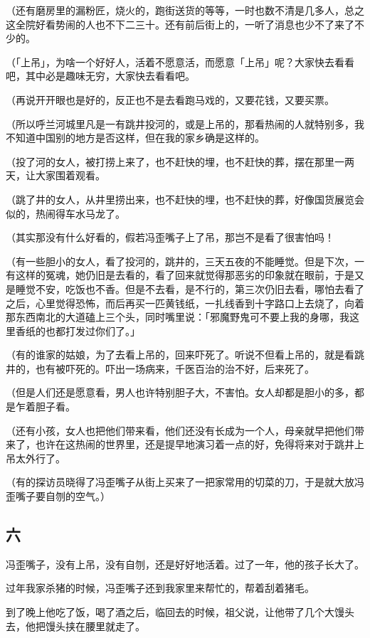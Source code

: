 \documentclass[UTF8]{ctexart}
\begin{document}
（还有磨房里的漏粉匠，烧火的，跑街送货的等等，一时也数不清是几多人，总之这全院好看势闹的人也不下二三十。还有前后街上的，一听了消息也少不了来了不少的。

（「上吊」，为啥一个好好人，活着不愿意活，而愿意「上吊」呢？大家快去看看吧，其中必是趣味无穷，大家快去看看吧。

（再说开开眼也是好的，反正也不是去看跑马戏的，又要花钱，又要买票。

（所以呼兰河城里凡是一有跳井投河的，或是上吊的，那看热闹的人就特别多，我不知道中国别的地方是否这样，但在我的家乡确是这样的。

（投了河的女人，被打捞上来了，也不赶快的埋，也不赶快的葬，摆在那里一两天，让大家围着观看。

（跳了井的女人，从井里捞出来，也不赶快的埋，也不赶快的葬，好像国货展览会似的，热闹得车水马龙了。

（其实那没有什么好看的，假若冯歪嘴子上了吊，那岂不是看了很害怕吗！

（有一些胆小的女人，看了投河的，跳井的，三天五夜的不能睡觉。但是下次，一有这样的冤魂，她仍旧是去看的，看了回来就觉得那恶劣的印象就在眼前，于是又是睡觉不安，吃饭也不香。但是不去看，是不行的，第三次仍旧去看，哪怕去看了之后，心里觉得恐怖，而后再买一匹黄钱纸，一扎线香到十字路口上去烧了，向着那东西南北的大道磕上三个头，同时嘴里说：「邪魔野鬼可不要上我的身哪，我这里香纸的也都打发过你们了。」

（有的谁家的姑娘，为了去看上吊的，回来吓死了。听说不但看上吊的，就是看跳井的，也有被吓死的。吓出一场病来，千医百治的治不好，后来死了。

（但是人们还是愿意看，男人也许特别胆子大，不害怕。女人却都是胆小的多，都是乍着胆子看。

（还有小孩，女人也把他们带来看，他们还没有长成为一个人，母亲就早把他们带来了，也许在这热闹的世界里，还是提早地演习着一点的好，免得将来对于跳井上吊太外行了。

（有的探访员晓得了冯歪嘴子从街上买来了一把家常用的切菜的刀，于是就大放冯歪嘴子要自刎的空气。）

\subsection{六}

冯歪嘴子，没有上吊，没有自刎，还是好好地活着。过了一年，他的孩子长大了。

过年我家杀猪的时候，冯歪嘴子还到我家里来帮忙的，帮着刮着猪毛。

到了晚上他吃了饭，喝了酒之后，临回去的时候，祖父说，让他带了几个大馒头去，他把馒头挟在腰里就走了。
\end{document}
